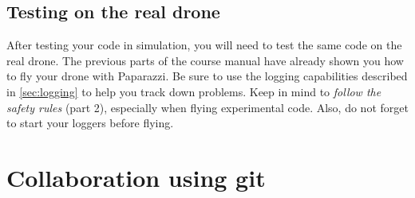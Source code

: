 \documentclass{article}
\begin{document}
\subsection{Testing on the real drone}
After testing your code in simulation, you will need to test the same code on the real drone. The previous parts of the course manual have already shown you how to fly your drone with Paparazzi. Be sure to use the logging capabilities described in \autoref{sec:logging} to help you track down problems. Keep in mind to \emph{follow the safety rules} (part 2), especially when flying experimental code. Also, do not forget to start your loggers before flying.



\section{Collaboration using git}
%
%
%
%
%
%
%
%
%
%
%
\end{document}
